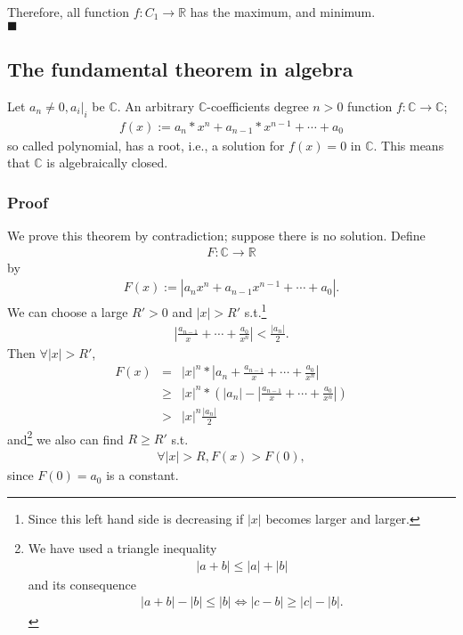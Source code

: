 \documentclass[11pt]{book}
\begin{document}
Therefore, all function $f : C_1 \to \mathbb{R}$ has the maximum, and minimum.\\
$\blacksquare$

\subsection{The fundamental theorem in algebra}
\label{TheFundamentalTheoremInAlgebra}
Let $a_n \neq 0, \left. a_i\right|_i$ be $\mathbb{C}$.
An arbitrary $\mathbb{C}$-coefficients degree $n>0$ function $f: \mathbb{C} \to \mathbb{C}$;
\begin{eqnarray}
\label{nDegreePolynomial}
f(x) := a_n * x^n + a_{n-1} * x^{n-1} + \cdots + a_0 %
\end{eqnarray}
so called polynomial, has a root, i.e., a solution for $f(x)=0$ in $\mathbb{C}$.
This means that $\mathbb{C}$ is algebraically closed.

\subsubsection{Proof}
We prove this theorem by contradiction; suppose there is no solution.
Define
\begin{eqnarray}
F: \mathbb{C} \to \mathbb{R}
\end{eqnarray}
by
\begin{eqnarray}
F(x) := \left| a_n x^n + a_{n-1} x^{n-1} + \cdots + a_0 \right|.
\end{eqnarray}
We can choose a large $R'>0$ and $|x|>R'$ s.t.\footnote{
Since this left hand side is decreasing if $|x|$ becomes larger and larger.
}
\begin{eqnarray}
\left|\frac{a_{n-1}}{x} + \cdots + \frac{a_0}{x^n} \right| < \frac{|a_n|}{2}.
\end{eqnarray}
Then $\forall |x| > R'$,
\begin{eqnarray}
F(x) &=& |x|^n * \left|a_n + \frac{a_{n-1}}{x} + \cdots + \frac{a_0}{x^n} \right| \\
&\geq& |x|^n *\left( \left|a_n \right| - \left| \frac{a_{n-1}}{x} + \cdots + \frac{a_0}{x^n} \right| \right) \\
&>& |x|^n \frac{|a_n|}{2} 
\end{eqnarray}
and\footnote{
We have used a triangle inequality
\begin{eqnarray}
|a+b| \leq |a| + |b|
\end{eqnarray}
and its consequence
\begin{eqnarray}
|a+b| - |b| \leq |b| \Leftrightarrow |c-b| \geq |c| -|b|.
\end{eqnarray}
}
we also can find $R \geq R'$ s.t.
\begin{eqnarray}
\forall |x| > R, F(x) > F(0),
\end{eqnarray}
since $F(0) = a_0$ is a constant.
\end{document}
